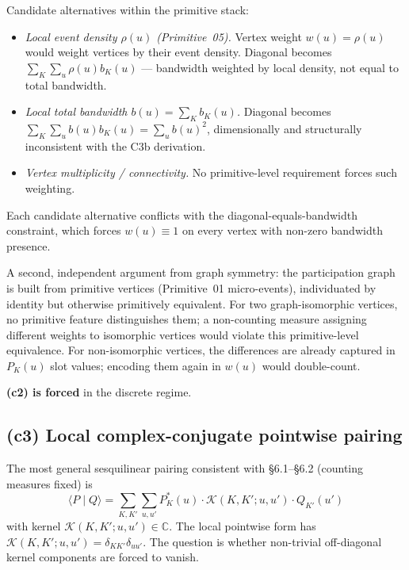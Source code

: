 \documentclass[11pt,a4paper]{article}
\begin{document}
Candidate alternatives within the primitive stack:

\begin{itemize}
  \item \emph{Local event density $\rho(u)$ (Primitive~05).} Vertex weight $w(u) = \rho(u)$ would weight vertices by their event density. Diagonal becomes $\sum_K \sum_u \rho(u) b_K(u)$ --- bandwidth weighted by local density, not equal to total bandwidth.
  \item \emph{Local total bandwidth $b(u) = \sum_K b_K(u)$.} Diagonal becomes $\sum_K \sum_u b(u) b_K(u) = \sum_u b(u)^2$, dimensionally and structurally inconsistent with the C3b derivation.
  \item \emph{Vertex multiplicity / connectivity.} No primitive-level requirement forces such weighting.
\end{itemize}

Each candidate alternative conflicts with the diagonal-equals-bandwidth constraint, which forces $w(u) \equiv 1$ on every vertex with non-zero bandwidth presence.

A second, independent argument from graph symmetry: the participation graph is built from primitive vertices (Primitive~01 micro-events), individuated by identity but otherwise primitively equivalent. For two graph-isomorphic vertices, no primitive feature distinguishes them; a non-counting measure assigning different weights to isomorphic vertices would violate this primitive-level equivalence. For non-isomorphic vertices, the differences are already captured in $P_K(u)$ slot values; encoding them again in $w(u)$ would double-count.

\textbf{(c2) is forced} in the discrete regime.

\subsection{(c3) Local complex-conjugate pointwise pairing}

The most general sesquilinear pairing consistent with \S 6.1--\S 6.2 (counting measures fixed) is
\begin{equation}
\langle P \mid Q \rangle = \sum_{K, K'} \sum_{u, u'} P_K^*(u) \cdot \mathcal{K}(K, K'; u, u') \cdot Q_{K'}(u')
\label{eq:generalkernel}
\end{equation}
with kernel $\mathcal{K}(K, K'; u, u') \in \mathbb{C}$. The local pointwise form has $\mathcal{K}(K, K'; u, u') = \delta_{KK'} \delta_{uu'}$. The question is whether non-trivial off-diagonal kernel components are forced to vanish.
\end{document}
